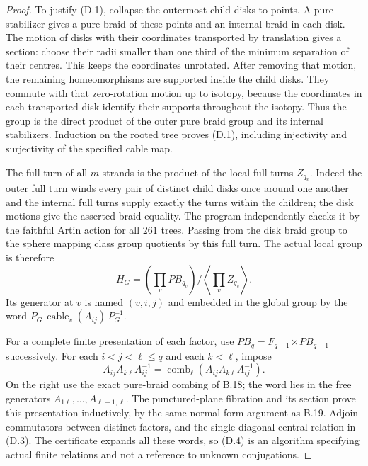 \begin{proof}
To justify (D.1), collapse the outermost child disks to points.
A pure stabilizer gives a pure braid of these points and an
internal braid in each disk.  The motion of disks with their
coordinates transported by translation gives a section: choose
their radii smaller than one third of the minimum separation
of their centres.  This keeps the coordinates unrotated.
After removing that motion, the remaining homeomorphisms are
supported inside the child disks.  They commute with that
zero-rotation motion up to isotopy, because the coordinates in
each transported disk identify their supports throughout the
isotopy.  Thus the group is the direct product of the outer
pure braid group and its internal stabilizers.  Induction on
the rooted tree proves (D.1), including injectivity and
surjectivity of the specified cable map.

The full turn of all $m$ strands is the product of the local
full turns $Z_{q_v}$.  Indeed the outer full turn winds every
pair of distinct child disks once around one another and the
internal full turns supply exactly the turns within the
children; the disk motions give the asserted braid equality.
The program independently checks it by the faithful Artin
action for all $261$ trees.  Passing from the disk braid group
to the sphere mapping class group quotients by this full turn.
The actual local group is therefore
\[
 H_G=\left(\prod_vPB_{q_v}\right)
        \big/\left\langle\prod_v Z_{q_v}\right\rangle.        \tag{D.3}
\]
Its generator at $v$ is named $(v,i,j)$ and embedded in the
global group by the word
$P_G\,\operatorname{cable}_v(A_{ij})\,P_G^{-1}$.

For a complete finite presentation of each factor, use
$PB_q=F_{q-1}\rtimes PB_{q-1}$ successively.  For each
$i<j<\ell\leq q$ and each $k<\ell$, impose
\[
 A_{ij}A_{k\ell}A_{ij}^{-1}
       =\operatorname{comb}_{\ell}
                  (A_{ij}A_{k\ell}A_{ij}^{-1}).               \tag{D.4}
\]
On the right use the exact pure-braid combing of B.18; the
word lies in the free generators $A_{1\ell},\ldots,
A_{\ell-1,\ell}$.  The punctured-plane fibration and its
section prove this presentation inductively, by the same
normal-form argument as B.19.  Adjoin commutators between
distinct factors, and the single diagonal central relation
in (D.3).  The certificate expands all these words, so (D.4)
is an algorithm specifying actual finite relations and not a
reference to unknown conjugations.


\end{proof}
